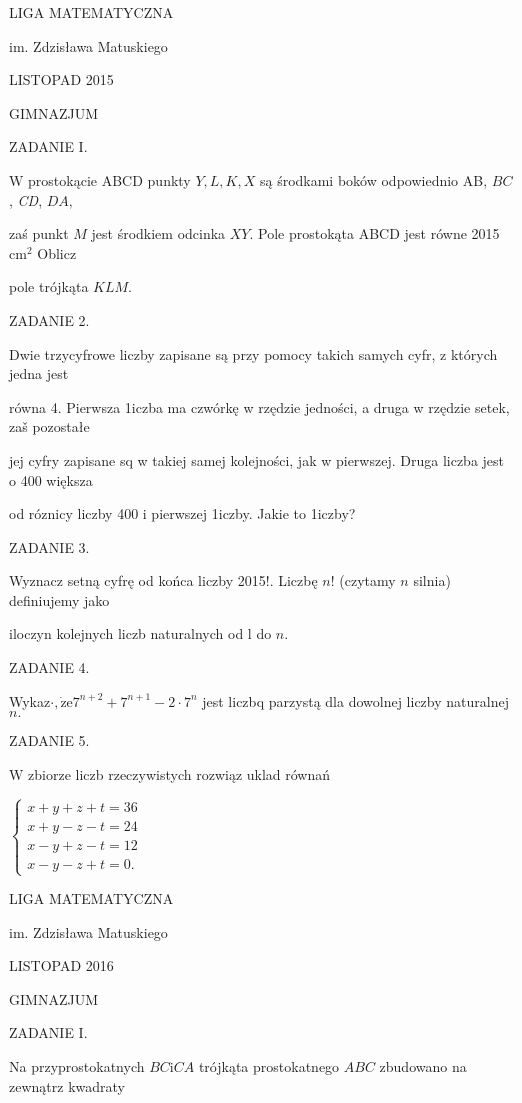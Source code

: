 \documentclass[a4paper,12pt]{article}
\begin{document}
LIGA MATEMATYCZNA

im. Zdzisława Matuskiego

LISTOPAD 2015

GIMNAZJUM

ZADANIE I.

$\mathrm{W}$ prostokącie ABCD punkty $Y, L, K, X$ są środkami boków odpowiednio AB, $BC$, {\it CD}, $DA,$

zaś punkt $M$ jest środkiem odcinka $XY$. Pole prostokąta ABCD jest równe 2015 $\mathrm{c}\mathrm{m}^{2}$ Oblicz

pole trójkąta $KLM.$

ZADANIE 2.

Dwie trzycyfrowe liczby zapisane są przy pomocy takich samych cyfr, z których jedna jest

równa 4. Pierwsza 1iczba ma czwórkę w rzędzie jedności, a druga w rzędzie setek, zaš pozostałe

jej cyfry zapisane sq w takiej samej kolejności, jak w pierwszej. Druga liczba jest o 400 większa

od róznicy liczby 400 i pierwszej 1iczby. Jakie to 1iczby?

ZADANIE 3.

Wyznacz setną cyfrę od końca liczby 2015!. Liczbę $n!$ (czytamy $n$ silnia) definiujemy jako

iloczyn kolejnych liczb naturalnych od l do $n.$

ZADANIE 4.

Wykaz$\cdot, \dot{\mathrm{z}}\mathrm{e}7^{n+2}+7^{n+1}-2\cdot 7^{n}$ jest liczbq parzystą dla dowolnej liczby naturalnej $n.$

ZADANIE 5.

$\mathrm{W}$ zbiorze liczb rzeczywistych rozwiąz uklad równań

$\left\{\begin{array}{l}
x+y+z+t=36\\
x+y-z-t=24\\
x-y+z-t=12\\
x-y-z+t=0.
\end{array}\right.$






LIGA MATEMATYCZNA

im. Zdzisława Matuskiego

LISTOPAD 2016

GIMNAZJUM

ZADANIE I.

Na przyprostokatnych $BC\mathrm{i}CA$ trójkąta prostokatnego $ABC$ zbudowano na zewnątrz kwadraty
\end{document}
